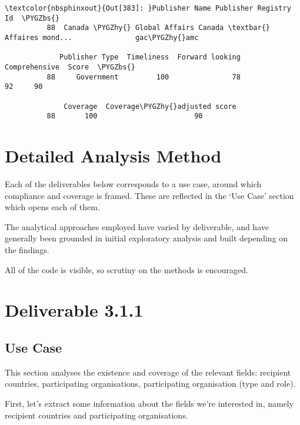 \documentclass[letterpaper,10pt,english]{sphinxmanual}
\begin{document}
\begin{Verbatim}[commandchars=\\\{\}]
\textcolor{nbsphinxout}{Out[383]: }Publisher Name Publisher Registry Id  \PYGZbs{}
          88  Canada \PYGZhy{} Global Affairs Canada \textbar{} Affaires mond...               gac\PYGZhy{}amc
          
             Publisher Type  Timeliness  Forward looking  Comprehensive  Score  \PYGZbs{}
          88     Government         100               78             92     90
          
              Coverage  Coverage\PYGZhy{}adjusted score
          88       100                       90
\end{Verbatim}


\section{Detailed Analysis Method}
\label{\detokenize{Global Affairs Canada - Compliance Report:Detailed-Analysis-Method}}
Each of the deliverables below corresponds to a use case, around which
compliance and coverage is framed. These are reflected in the `Use Case'
section which opens each of them.

The analytical approaches employed have varied by deliverable, and have
generally been grounded in initial exploratory analysis and built
depending on the findings.

All of the code is visible, so scrutiny on the methods is encouraged.


\section{Deliverable 3.1.1}
\label{\detokenize{Global Affairs Canada - Compliance Report:Deliverable-3.1.1}}

\subsection{Use Case}
\label{\detokenize{Global Affairs Canada - Compliance Report:Use-Case}}

This section analyses the existence and coverage of the relevant fields:
recipient countries, participating organisations, participating
organisation (type and role).

First, let's extract some information about the fields we're interested
in, namely recipient countries and participating organisations.
\end{document}
